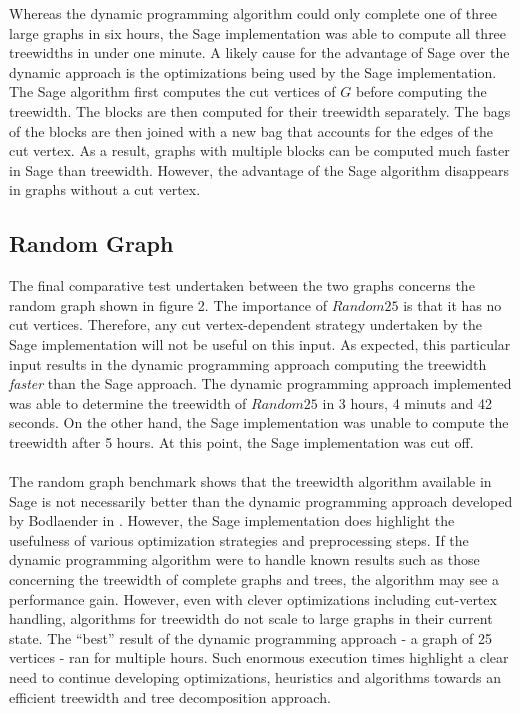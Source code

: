 \documentclass[12pt,conference]{IEEEtran}
\theoremstyle{plain}
\begin{document}
Whereas the dynamic programming algorithm could only complete one of three large graphs in six hours, the Sage implementation was able to compute all three treewidths in under one minute. A likely cause for the advantage of Sage over the dynamic approach is the optimizations being used by the Sage implementation. The Sage algorithm first computes the cut vertices of $G$ before computing the treewidth. The blocks are then computed for their treewidth separately. The bags of the blocks are then joined with a new bag that accounts for the edges of the cut vertex. As a result, graphs with multiple blocks can be computed much faster in Sage than treewidth. However, the advantage of the Sage algorithm disappears in graphs without a cut vertex.

\subsection{Random Graph}

The final comparative test undertaken between the two graphs concerns the random graph shown in figure 2. The importance of $Random25$ is that it has no cut vertices. Therefore, any cut vertex-dependent strategy undertaken by the Sage implementation will not be useful on this input. As expected, this particular input results in the dynamic programming approach computing the treewidth \textit{faster} than the Sage approach. The dynamic programming approach implemented was able to determine the treewidth of $Random25$ in 3 hours, 4 minuts and 42 seconds. On the other hand, the Sage implementation was unable to compute the treewidth after 5 hours. At this point, the Sage implementation was cut off.
\\
\\
The random graph benchmark shows that the treewidth algorithm available in Sage is not necessarily better than the dynamic programming approach developed by Bodlaender in \cite{bodlaender-2012}. However, the Sage implementation does highlight the usefulness of various optimization strategies and preprocessing steps. If the dynamic programming algorithm were to handle known results such as those concerning the treewidth of complete graphs and trees, the algorithm may see a performance gain. However, even with clever optimizations including cut-vertex handling, algorithms for treewidth do not scale to large graphs in their current state. The ``best'' result of the dynamic programming approach - a graph of 25 vertices - ran for multiple hours. Such enormous execution times highlight a clear need to continue developing optimizations, heuristics and algorithms towards an efficient treewidth and tree decomposition approach.
\end{document}
